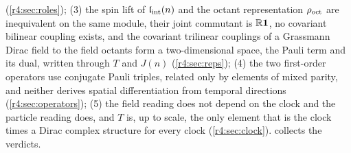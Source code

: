 (\cref{r4:sec:roles});
(3) the spin lift of $\mathfrak l_{\rm int}(n)$ and the octant representation $\rho_{\rm oct}$ are inequivalent on the same module, their joint commutant is $\mathbb{R}\mathbf 1$,
no covariant bilinear coupling exists, and the covariant trilinear couplings of a Grassmann Dirac field to the field octants form a
two-dimensional space, the Pauli term and its dual, written through $T$ and $J(n)$ (\cref{r4:sec:reps});
(4) the two first-order operators use conjugate Pauli triples, related only by elements of mixed parity, and neither derives spatial
differentiation from temporal directions (\cref{r4:sec:operators});
(5) the field reading does not depend on the clock and the particle reading does, and $T$ is, up to scale, the only element that is the clock
times a Dirac complex structure for every clock (\cref{r4:sec:clock}).  collects the verdicts.

